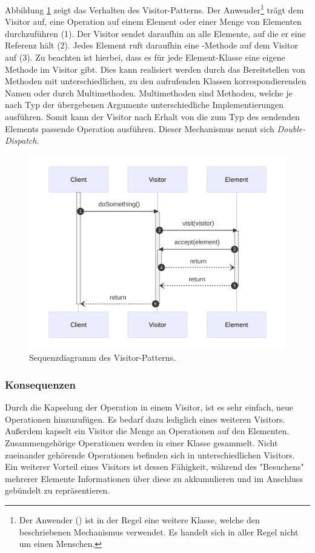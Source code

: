 Abbildung \ref{fig:visitor-seq} zeigt das Verhalten des Visitor-Patterns. Der Anwender\footnote{Der Anwender () ist in der Regel eine weitere Klasse, welche den beschriebenen Mechanismus verwendet. Es handelt sich in aller Regel nicht um einen Menschen.} trägt dem Visitor auf, eine Operation auf einem Element oder einer Menge von Elementen durchzuführen (1). Der Visitor sendet daraufhin  an alle Elemente, auf die er eine Referenz hält (2). Jedes Element ruft daraufhin eine -Methode auf dem Visitor auf (3). Zu beachten ist hierbei, dass es für jede Element-Klasse eine eigene Methode im Visitor gibt. Dies kann realisiert werden durch das Bereitstellen von Methoden mit unterschiedlichen, zu den aufrufenden Klassen korrespondierenden Namen oder durch Multimethoden. Multimethoden sind Methoden, welche je nach Typ der übergebenen Argumente unterschiedliche Implementierungen ausführen. Somit kann der Visitor nach Erhalt von  die zum Typ des sendenden Elements passende Operation ausführen. Dieser Mechanismus nennt sich \emph{Double-Dispatch}.

\begin{figure}[htb]
	\centering
	\includegraphics[width=0.75\linewidth]{images/patterns/visitor-seq.png}
	\caption{Sequenzdiagramm des Visitor-Patterns. \cite{skobeleva_visitor_2023}}
	\label{fig:visitor-seq}
\end{figure}

\subsubsection*{Konsequenzen}
Durch die Kapselung der Operation in einem Visitor, ist es sehr einfach, neue Operationen hinzuzufügen. Es bedarf dazu lediglich eines weiteren Visitors. Außerdem kapselt ein Visitor die Menge an Operationen auf den Elementen. Zusammengehörige Operationen werden in einer Klasse gesammelt. Nicht zueinander gehörende Operationen befinden sich in unterschiedlichen Visitors. Ein weiterer Vorteil eines Visitors ist dessen Fähigkeit, während des "Besuchens" mehrerer Elemente Informationen über diese zu akkumulieren und im Anschluss gebündelt zu repräsentieren.

